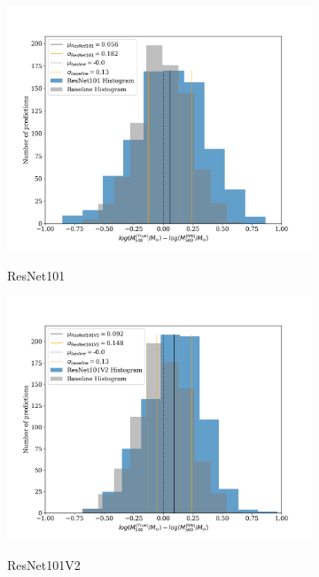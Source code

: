 \begin{figure}[H]
\begin{subfigure}{.325\textwidth}
    \centering
    \includegraphics[width=\linewidth]{images/Chapter4/Results/test_ResNet101_hist.png}
    \label{fig:test_ResNet101_hist}
    \caption{ResNet101}
\end{subfigure}
\begin{subfigure}{.325\textwidth}
    \centering
    \includegraphics[width=\linewidth]{images/Chapter4/Results/test_ResNet101V2_hist.png}
    \label{fig:test_ResNet101V2_hist}
    \caption{ResNet101V2}
\end{subfigure}
\begin{subfigure}{.325\textwidth}
    \centering

\end{subfigure}
\end{figure}
